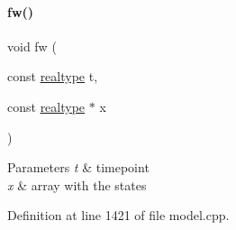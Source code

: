 \paragraph{\texorpdfstring{fw()}{fw()}\hspace{0.1cm}{\footnotesize\ttfamily [1/2]}}
{\footnotesize\ttfamily void fw (\begin{DoxyParamCaption}\item[{const \mbox{\hyperlink{namespaceamici_a1bdce28051d6a53868f7ccbf5f2c14a3}{realtype}}}]{t,  }\item[{const \mbox{\hyperlink{namespaceamici_a1bdce28051d6a53868f7ccbf5f2c14a3}{realtype}} $\ast$}]{x }\end{DoxyParamCaption})}


\begin{DoxyParams}{Parameters}
{\em t} & timepoint \\
\hline
{\em x} & array with the states \\
\hline
\end{DoxyParams}


Definition at line 1421 of file model.\+cpp.

